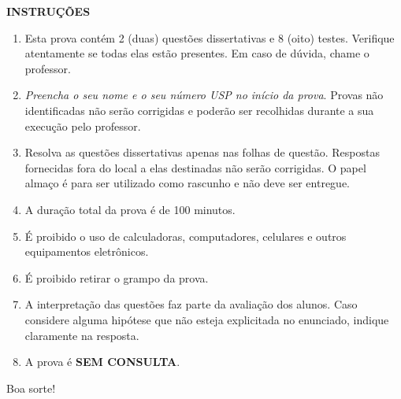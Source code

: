 \centerline{\textbf{INSTRUÇÕES}}

\begin{enumerate}
\item Esta prova contém 2 (duas) questões dissertativas e 8 (oito) testes. Verifique atentamente se todas elas estão presentes. Em caso de dúvida, chame o professor.
\item \emph{Preencha o seu nome e o seu número USP no início da prova}. Provas não identificadas não serão corrigidas e poderão ser recolhidas durante a sua execução pelo professor.
\item Resolva as questões dissertativas apenas nas folhas de questão. Respostas fornecidas fora do local a elas destinadas não serão corrigidas. O papel almaço é para ser utilizado como rascunho e não deve ser entregue.
\item A duração total da prova é de 100 minutos.
\item É proibido o uso de calculadoras, computadores, celulares e outros equipamentos eletrônicos.
\item É proibido retirar o grampo da prova.
\item A interpretação das questões faz parte da avaliação dos alunos. Caso considere alguma hipótese que não esteja explicitada no enunciado, indique claramente na resposta.
\item A prova é \textbf{SEM CONSULTA}.
\end{enumerate}

Boa sorte!\\

